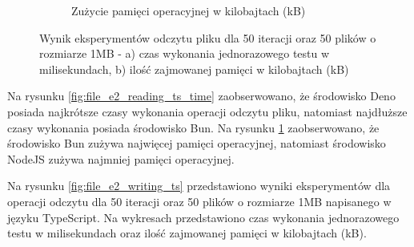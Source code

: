 \begin{figure}[H]
\begin{subfigure}[b]{0.42\textwidth}
    \caption{Zużycie pamięci operacyjnej w kilobajtach (kB)}
    \label{fig:file_e2_reading_ts_memory}
  \end{subfigure}
  \caption{Wynik eksperymentów odczytu pliku dla 50 iteracji oraz 50 plików o rozmiarze 1MB - a) czas wykonania jednorazowego testu w milisekundach, b) ilość zajmowanej pamięci w kilobajtach (kB)}
  \label{fig:file_e2_reading_ts}
\end{figure}

Na rysunku \ref{fig:file_e2_reading_ts_time} zaobserwowano, że środowisko Deno posiada najkrótsze czasy wykonania operacji odczytu pliku, natomiast najdłuższe czasy wykonania posiada środowisko Bun. Na rysunku \ref{fig:file_e2_reading_ts_memory} zaobserwowano, że środowisko Bun zużywa najwięcej pamięci operacyjnej, natomiast środowisko NodeJS zużywa najmniej pamięci operacyjnej.

Na rysunku \ref{fig:file_e2_writing_ts} przedstawiono wyniki eksperymentów dla operacji odczytu dla 50 iteracji oraz 50 plików o rozmiarze 1MB napisanego w języku TypeScript. Na wykresach przedstawiono czas wykonania jednorazowego testu w milisekundach oraz ilość zajmowanej pamięci w kilobajtach (kB).

